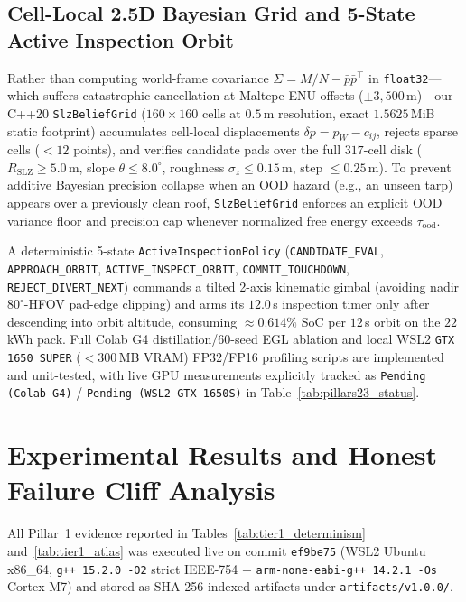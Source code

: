 \documentclass[conference,10pt]{IEEEtran}
\begin{document}
\subsection{Cell-Local 2.5D Bayesian Grid and 5-State Active Inspection Orbit}

Rather than computing world-frame covariance $\Sigma=M/N-\bar{p}\bar{p}^\top$ in \texttt{float32}---which suffers catastrophic cancellation at Maltepe ENU offsets ($\pm 3{,}500$\,m)---our C++20 \texttt{SlzBeliefGrid} ($160\times 160$ cells at $0.5$\,m resolution, exact $1.5625$\,MiB static footprint) accumulates cell-local displacements $\delta p = p_W - c_{ij}$, rejects sparse cells ($<12$ points), and verifies candidate pads over the full $317$-cell disk ($R_{\text{SLZ}}\ge 5.0$\,m, slope $\theta\le 8.0^\circ$, roughness $\sigma_z\le 0.15$\,m, step $\le 0.25$\,m). To prevent additive Bayesian precision collapse when an OOD hazard (e.g., an unseen tarp) appears over a previously clean roof, \texttt{SlzBeliefGrid} enforces an explicit OOD variance floor and precision cap whenever normalized free energy exceeds $\tau_{\text{ood}}$.

A deterministic 5-state \texttt{ActiveInspectionPolicy} (\texttt{CANDIDATE\_EVAL}, \texttt{APPROACH\_ORBIT}, \texttt{ACTIVE\_INSPECT\_ORBIT}, \texttt{COMMIT\_TOUCHDOWN}, \texttt{REJECT\_DIVERT\_NEXT}) commands a tilted 2-axis kinematic gimbal (avoiding nadir $80^\circ$-HFOV pad-edge clipping) and arms its $12.0$\,s inspection timer only after descending into orbit altitude, consuming $\approx 0.614\%$ SoC per $12$\,s orbit on the $22$\,kWh pack. Full Colab G4 distillation/60-seed EGL ablation and local WSL2 \texttt{GTX 1650 SUPER} ($<300$\,MB VRAM) FP32/FP16 profiling scripts are implemented and unit-tested, with live GPU measurements explicitly tracked as \texttt{Pending (Colab G4)} / \texttt{Pending (WSL2 GTX 1650S)} in Table~\ref{tab:pillars23_status}.

\section{Experimental Results and Honest Failure Cliff Analysis}
\label{sec:results}

All Pillar~1 evidence reported in Tables~\ref{tab:tier1_determinism} and~\ref{tab:tier1_atlas} was executed live on commit \texttt{ef9be75} (WSL2 Ubuntu x86\_64, \texttt{g++ 15.2.0 -O2} strict IEEE-754 + \texttt{arm-none-eabi-g++ 14.2.1 -Os} Cortex-M7) and stored as SHA-256-indexed artifacts under \texttt{artifacts/v1.0.0/}.
\end{document}
